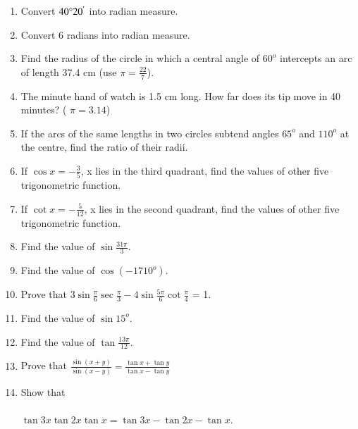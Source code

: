\begin{enumerate}[label=\arabic*]
\item Convert $40\degree  20^{'}$ into radian measure.
\item Convert 6 radians into radian measure.
\item Find the radius of the circle in which a central angle of $60^{o}$ intercepts an arc of length 37.4 cm (use $\pi = \frac{22}{7}$).

\item The minute hand of watch is 1.5 cm long. How far does its tip move in 40 minutes? ( $\pi = 3.14$)

\item If the arcs of the same lengths in two circles subtend angles $65^{o}$ and $110^{o}$ at the centre, find the ratio of their radii.

\item If $\cos x = -\frac{3}{5}$, x lies in the third quadrant, find the values of other five trigonometric function.

\item If $\cot x = - \frac{5}{12}$, x lies in the second quadrant, find the values of other five trigonometric function.\\ 


\item Find the value of $\sin \frac{31\pi}{3}$.\\

\item Find the value of $\cos(-1710^o)$.\\


\item Prove that 3$\sin\frac{\pi}{6}\sec\frac{\pi}{3}-4\sin\frac{5\pi}{6}\cot\frac{\pi}{4}$ = 1.\\


\item Find the value of $\sin 15^{o}$.\\

\item Find the value of $\tan\frac{13\pi}{12}$.\\


\item Prove that $\frac{\sin(x+y)}{\sin(x-y)} = \frac{\tan x + \tan y}{\tan x - \tan y}$\\


\item Show that\\
\\$\tan3x\tan2x\tan x = \tan3x-\tan2x-\tan x$.\\



\end{enumerate}
